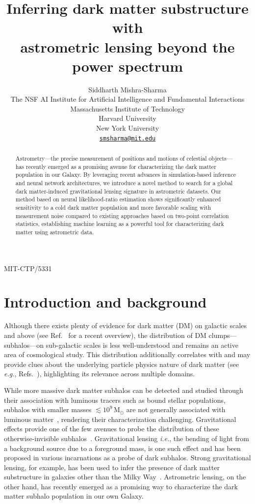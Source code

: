 \documentclass[preprint]{article}
\title{Inferring dark matter substructure with \\ astrometric lensing beyond the power spectrum}
\author{
Siddharth Mishra-Sharma \\
The NSF AI Institute for Artificial Intelligence and Fundamental Interactions \\
Massachusetts Institute of Technology \\
Harvard University \\ 
New York University \\
\href{mailto:smsharma@mit.edu}{\texttt{smsharma@mit.edu}} \\
}
\begin{document}
\hfill MIT-CTP/5331
\maketitle

\begin{abstract}
Astrometry---the precise measurement of positions and motions of celestial objects---has recently emerged as a promising avenue for characterizing the dark matter population in our Galaxy. By leveraging recent advances in simulation-based inference and neural network architectures, we introduce a novel method to search for a global dark matter-induced gravitational lensing signature in astrometric datasets. Our method based on neural likelihood-ratio estimation shows significantly enhanced sensitivity to a cold dark matter population and more favorable scaling with measurement noise compared to existing approaches based on two-point correlation statistics, establishing machine learning as a powerful tool for characterizing dark matter using astrometric data. 
\end{abstract}

\section{Introduction and background}
\label{sec:intro}

Although there exists plenty of evidence for dark matter (DM) on galactic scales and above (see Ref.~\cite{Green:2021jrr} for a recent overview), the distribution of DM clumps---subhalos---on sub-galactic scales is less well-understood and remains an active area of cosmological study. This distribution additionally correlates with and may provide clues about the underlying particle physics nature of dark matter (see \emph{e.g.}, Refs.~\cite{Schutz:2020jox,Bode:2000gq,Dalcanton:2000hn}), highlighting its relevance across multiple domains.

While more massive dark matter subhalos can be detected and studied through their association with luminous tracers such as bound stellar populations, subhalos with smaller masses $\lesssim 10^9\,\mathrm M_\odot$ are not generally associated with luminous matter~\cite{Fitts:2016usl,2017MNRAS.467.2019R}, rendering their characterization challenging. Gravitational effects provide one of the few avenues to probe the distribution of these otherwise-invisible subhalos~\cite{Buckley:2017ijx}. Gravitational lensing \emph{i.e.}, the bending of light from a background source due to a foreground mass, is one such effect and has been proposed in various incarnations as a probe of dark subhalos. 
Strong gravitational lensing, for example, has been used to infer the presence of dark matter substructure in galaxies other than the Milky Way~\cite{Hezaveh:2016ltk,Vegetti:2009cz,Gilman:2019nap,Vegetti:2012mc}.
Astrometric lensing, on the other hand, has recently emerged as a promising way to characterize the dark matter subhalo population in our own Galaxy.
\end{document}
